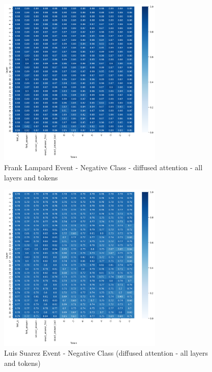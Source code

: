 \documentclass{article}
\begin{document}
\clearpage

\begin{figure}[p]
    \centering
    \includegraphics[width=0.7\textwidth]{frank_lampard_negative_class.png}
    \caption{Frank Lampard Event - Negative Class - diffused attention - all layers and tokens}
    \label{fig:lampard-negative}
\end{figure}

\clearpage

\begin{figure}[p]
    \centering
    \includegraphics[width=0.7\textwidth]{luis_suarez_negative_class.png}
    \caption{Luis Suarez Event - Negative Class (diffused attention - all layers and tokens)}
    \label{fig:suarez-negative}
\end{figure}
\end{document}
